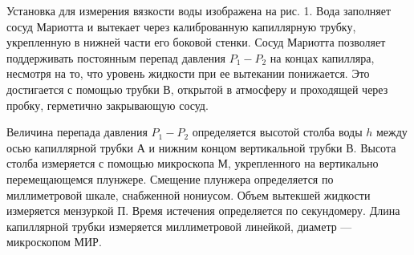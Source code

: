 \documentclass[a4paper]{article}
\begin{document}
Установка для измерения вязкости воды изображена на рис. 1.
Вода заполняет сосуд Мариотта и вытекает через калиброванную капиллярную трубку, укрепленную в нижней части его боковой стенки. Сосуд Мариотта позволяет поддерживать постоянным перепад давления $P_1 - P_2$ на концах капилляра, несмотря на то, что уровень жидкости при ее вытекании понижается. Это достигается с помощью трубки В, открытой в атмосферу и проходящей через пробку, герметично закрывающую сосуд. \par
Величина перепада давления $P_1 - P_2$ определяется высотой столба воды $h$ между осью капиллярной трубки А и нижним концом вертикальной трубки В. Высота столба измеряется с помощью микроскопа М, укрепленного на вертикально перемещающемся плунжере. Смещение плунжера определяется по миллиметровой шкале, снабженной нониусом. Объем вытекшей жидкости измеряется мензуркой П. Время истечения определяется по секундомеру. Длина капиллярной трубки измеряется миллиметровой линейкой, диаметр ---
 микроскопом МИР.
\end{document}
